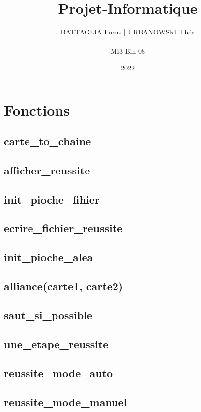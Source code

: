 \documentclass{article}
\title{\huge \textbf{Projet-Informatique}}
\author{BATTAGLIA Lucas | URBANOWSKI Théa \\ \\ MI3-Bin 08}
\date{2022}
\begin{document}
\maketitle

\section{Fonctions}
\subsection{carte_to_chaine}
\subsection{afficher_reussite}
\subsection{init_pioche_fihier}
\subsection{ecrire_fichier_reussite}
\subsection{init_pioche_alea}
\subsection{alliance(carte1, carte2)}
\subsection{saut_si_possible}
\subsection{une_etape_reussite}
\subsection{reussite_mode_auto}
\subsection{reussite_mode_manuel}
\end{document}
